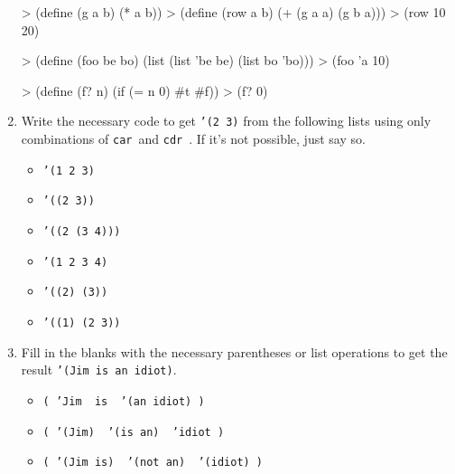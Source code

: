 \documentclass[pdftex,11pt]{article}
\newcommand{\spacew}[1]{\underline{\hspace{#1}}}
\newcommand{\car}{{\tt car}\ }
\newcommand{\cdr}{{\tt cdr}\ }
\begin{document}
\begin{enumerate}
\begin{minipage}{0.32\textwidth}
\begin{answer}
> (define (g a b)
    (* a b))
> (define (row a b)
    (+ (g a a) (g b a)))
> (row 10 20)

\underline{                    }
\end{answer}
\end{minipage}
\hspace{.02in}
\begin{minipage}{0.32\textwidth}
\begin{answer}
> (define (foo be bo)
    (list (list 'be be)
          (list bo 'bo)))
> (foo 'a 10)

\underline{                    }
\end{answer}
\end{minipage}
\hspace{.02in}
\begin{minipage}{0.32\textwidth}
\begin{answer}
> (define (f? n)
    (if (= n 0) #t #f))
> (f? 0)

\underline{                    }
\end{answer}
\end{minipage}

\item Write the necessary code to get {\tt '(2 3)} from the following
  lists using only combinations of \car and \cdr. If it's not
  possible, just say so.

  \begin{itemize}
  \item {\tt '(1 2 3)} \underline{\hspace{3in}}
  \item {\tt '((2 3))} \underline{\hspace{3in}}
  \item {\tt '((2 (3 4)))} \underline{\hspace{3in}}
  \item {\tt '(1 2 3 4)} \underline{\hspace{3in}}
  \item {\tt '((2) (3))} \underline{\hspace{3in}}
  \item {\tt '((1) (2 3))} \underline{\hspace{3in}}
  \end{itemize}

\item Fill in the blanks with the necessary parentheses or list
  operations to get the result {\tt '(Jim is an idiot)}.
  \begin{itemize}
  \item {\tt (\spacew{1in} 'Jim \spacew{.7in} is \spacew{.7in} '(an
      idiot) \spacew{.7in})}
  \item {\tt (\spacew{1in} '(Jim) \spacew{.7in} '(is an) \spacew{.7in}
      'idiot \spacew{.7in})}
  \item {\tt (\spacew{1in} '(Jim is) \spacew{1in} '(not an) \spacew{.7in}
      '(idiot) \spacew{.7in})}
  \end{itemize}


\end{enumerate}
\end{document}
